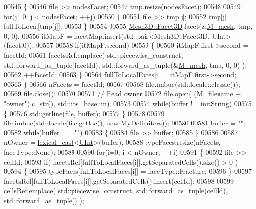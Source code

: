\begin{DoxyCode}
00545     \{
00546         file >> nodesFacet;
00547         tmp.resize(nodesFacet);
00548 
00549         \textcolor{keywordflow}{for}(j=0; j < nodesFacet; ++j)
00550         \{
00551             file >> tmp[j];
00552             tmp[j] = fullToLocal[tmp[j]];
00553         \}
00554 
00555         \hyperlink{classFVCode3D_1_1Mesh3D_1_1Facet3D}{Mesh3D::Facet3D} facet(&\hyperlink{classFVCode3D_1_1Importer_a6f1542d6c6ac192e36c8eec7dc366653}{M\_mesh}, tmp, 0, 0);
00556         itMapF = facetMap.insert(std::pair<Mesh3D::Facet3D, UInt>(facet,0));
00557 
00558         \textcolor{keywordflow}{if}(itMapF.second)
00559         \{
00560             itMapF.first->second = facetId;
00561             facetsRef.emplace( std::piecewise\_construct, std::forward\_as\_tuple(facetId), 
      std::forward\_as\_tuple(&\hyperlink{classFVCode3D_1_1Importer_a6f1542d6c6ac192e36c8eec7dc366653}{M\_mesh}, tmp, 0, 0) );
00562             ++facetId;
00563         \}
00564         fullToLocalFaces[i] = itMapF.first->second;
00565     \}
00566     nFacets = facetId;
00567 
00568     file.imbue(std::locale::classic());
00569     file.close();
00570 
00571     \textcolor{comment}{// Read owner}
00572     file.open( (\hyperlink{classFVCode3D_1_1Importer_a318e689fb93c5c906f85aa13685724d7}{M\_filename} + \textcolor{stringliteral}{"owner"}).c\_str(), std::ios\_base::in);
00573 
00574     \textcolor{keywordflow}{while}(buffer != initString)
00575     \{
00576         std::getline(file, buffer);
00577     \}
00578 
00579     file.imbue(std::locale(file.getloc(), \textcolor{keyword}{new} \hyperlink{structFVCode3D_1_1MyDelimiters}{MyDelimiters}));
00580 
00581     buffer = \textcolor{stringliteral}{""};
00582     \textcolor{keywordflow}{while}(buffer == \textcolor{stringliteral}{""})
00583     \{
00584         file >> buffer;
00585     \}
00586 
00587     nOwner = \hyperlink{namespaceFVCode3D_a7d8605df83383ec5cf62f7efe480a68a}{lexical\_cast}<\hyperlink{namespaceFVCode3D_a4bf7e328c75d0fd504050d040ebe9eda}{UInt}>(buffer);
00588     typeFaces.resize(nFacets, faceType::None);
00589 
00590     \textcolor{keywordflow}{for}(i=0; i < nOwner; ++i)
00591     \{
00592         file >> cellId;
00593         \textcolor{keywordflow}{if}( facetsRef[fullToLocalFaces[i]].getSeparatedCells().size() > 0 )
00594         \{
00595             typeFaces[fullToLocalFaces[i]] = faceType::Fracture;
00596         \}
00597         facetsRef[fullToLocalFaces[i]].getSeparatedCells().insert(cellId);
00598 
00599         cellsRef.emplace( std::piecewise\_construct, std::forward\_as\_tuple(cellId), std::forward\_as\_tuple() 
      );

\end{DoxyCode}
